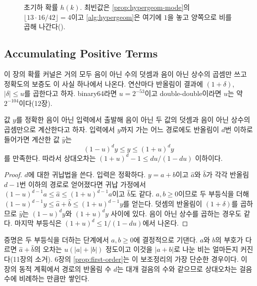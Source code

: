 \begin{figure}[htbp]
\centering
{}
\caption{초기하 확률 $h(k)$. 최빈값은 \cref{prop:hypergeom-mode}의 $\lfloor13\cdot16/42\rfloor=4$이고 \cref{alg:hypergeom}은 여기에 $1$을 놓고 양쪽으로 비를 곱해 나간다().}
\label{fig:hypergeom}
\end{figure}

\subsection{Accumulating Positive Terms}

이 장의 확률 커널은 거의 모두 음이 아닌 수의 덧셈과 음이 아닌 상수의 곱셈만 쓰고 정확도의 보증도 이 사실 하나에서 나온다. 연산마다 반올림이 결과에 $(1+\delta)$, $|\delta|\le u$를 곱한다고 하자. binary64라면 $u=2^{-53}$이고 double-double이라면 $u$는 약 $2^{-104}$이다(12장).

\begin{lemma}
\label{lem:positive-accum}
값 $y$를 정확한 음이 아닌 입력에서 출발해 음이 아닌 두 값의 덧셈과 음이 아닌 상수의 곱셈만으로 계산한다고 하자. 입력에서 $y$까지 가는 어느 경로에도 반올림이 $d$번 이하로 들어가면 계산한 값 $\hat y$는
\[
(1-u)^dy\le\hat y\le(1+u)^dy
\]
를 만족한다. 따라서 상대오차는 $(1+u)^d-1\le du/(1-du)$ 이하이다.
\end{lemma}

\begin{proof}
$d$에 대한 귀납법을 쓴다. 입력은 정확하다. $y=a+b$이고 $\hat a$와 $\hat b$가 각각 반올림 $d-1$번 이하의 경로로 얻어졌다면 귀납 가정에서 $(1-u)^{d-1}a\le\hat a\le(1+u)^{d-1}a$이고 $\hat b$도 같다. $a,b\ge0$이므로 두 부등식을 더해 $(1-u)^{d-1}y\le\hat a+\hat b\le(1+u)^{d-1}y$를 얻는다. 덧셈의 반올림이 $(1+\delta)$를 곱하므로 $\hat y$는 $(1-u)^dy$와 $(1+u)^dy$ 사이에 있다. 음이 아닌 상수를 곱하는 경우도 같다. 마지막 부등식은 $(1+u)^d\le1/(1-du)$에서 나온다.
\end{proof}

증명은 두 부등식을 더하는 단계에서 $a,b\ge0$에 결정적으로 기댄다. $a$와 $b$의 부호가 다르면 $\hat a+\hat b$의 오차는 $u(|a|+|b|)$ 정도이고 이것을 $|a+b|$로 나눈 비는 얼마든지 커진다(11장의 소거). 6장의 \cref{prop:first-order}는 이 보조정리의 가장 단순한 경우이다. 이 장의 동적 계획에서 경로의 반올림 수 $d$는 대개 걸음의 수와 같으므로 상대오차는 걸음 수에 비례하는 만큼만 쌓인다.

